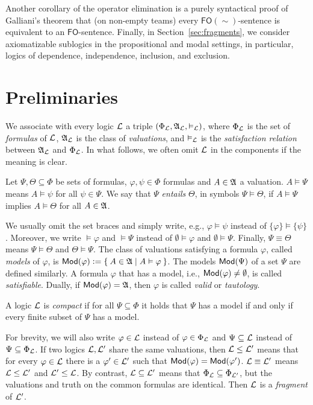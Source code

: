 \documentclass[a4paper,english,fleqn,11pt,final]{scrartcl}
\makeatletter
\newcommand{\ie}{i.e.\@\xspace}
\newcommand{\eg}{e.g.\@\xspace}
\newcommand{\Mod}[1]{{\protect\ensuremath{\mathsf{Mod}(#1)}}}
\newcommand{\negg}{{\sim}}
\newcommand{\logic}[1]{\ensuremath{\mathsf{#1}}\xspace}
\newcommand{\FO}{\logic{FO}}
\newcommand{\frakA}{\protect\ensuremath{\mathfrak{A}}}
\newcommand{\calL}{\protect\ensuremath{\mathcal{L}}}
\providecommand{\dfn}{\mathrel{\mathop:}=}
\theoremstyle{plain}
\theoremstyle{definition}
\makeatother
\begin{document}
Another corollary of the operator elimination is a purely syntactical proof of Galliani's theorem \cite{Galliani14} that (on non-empty teams) every $\FO(\negg)$-sentence is equivalent to an $\FO$-sentence.
Finally, in Section~\ref{sec:fragments}, we consider axiomatizable sublogics in the propositional and modal settings, in particular, logics of dependence, independence, inclusion, and exclusion.
 

\section{Preliminaries}


\label{sec:prelim}


We associate with every logic $\calL$ a triple $(\Phi_\calL, \frakA_\calL, \vDash_\calL)$, where $\Phi_\calL$ is the set of \emph{formulas} of $\calL$, $\frakA_\calL$ is the class of \emph{valuations}, and $\vDash_\calL$ is the \emph{satisfaction relation} between $\frakA_\calL$ and $\Phi_\calL$.
In what follows, we often omit $\calL$ in the components if the meaning is clear.

\medskip

Let $\Psi, \Theta \subseteq \Phi$ be sets of formulas, $\varphi,\psi \in \Phi$ formulas and $A \in \frakA$ a valuation.
$A \vDash \Psi$ means $A \vDash \psi$ for all $\psi \in \Psi$.
We say that $\Psi$ \emph{entails} $\Theta$, in symbols $\Psi \vDash \Theta$, if $A \vDash \Psi$ implies $A \vDash \Theta$ for all $A \in \frakA$.

We usually omit the set braces and simply write, \eg, $\varphi \vDash \psi$ instead of $\{\varphi\} \vDash \{\psi\}$.
Moreover, we write $\vDash \varphi$ and $\vDash \Psi$ instead of $\emptyset \vDash \varphi$ and $\emptyset \vDash \Psi$.
Finally, $\Psi \equiv \Theta$ means $\Psi \vDash \Theta$ and $\Theta \vDash \Psi$.
The class of valuations satisfying a formula $\varphi$, called \emph{models} of $\varphi$, is $\Mod{\varphi} \dfn \Set{A  \in \frakA | A \vDash \varphi}$.
The models $\Mod{\Psi}$ of a set $\Psi$ are defined similarly.
A formula $\varphi$ that has a model, \ie, $\Mod{\varphi} \neq \emptyset$, is called \emph{satisfiable}.
Dually, if $\Mod{\varphi} = \frakA$, then $\varphi$ is called \emph{valid} or \emph{tautology}.

A logic $\calL$ is \emph{compact} if for all $\Psi \subseteq \Phi$ it holds that $\Psi$ has a model if and only if every finite subset of $\Psi$ has a model.

For brevity, we will also write $\varphi \in \calL$ instead of $\varphi \in \Phi_\calL$ and $\Psi \subseteq \calL$ instead of $\Psi \subseteq \Phi_\calL$.
If two logics $\calL, \calL'$ share the same valuations, then $\calL \leq \calL'$ means that for every $\varphi \in \calL$ there is a $\varphi' \in \calL'$ such that $\Mod{\varphi} = \Mod{\varphi'}$. $\calL \equiv \calL'$ means $\calL \leq \calL'$ and $\calL'\leq \calL$.
By contrast, $\calL \subseteq \calL'$ means that $\Phi_\calL \subseteq \Phi_{\calL'}$, but the valuations and truth on the common formulas are identical. Then $\calL$ is a \emph{fragment} of $\calL'$.
\end{document}
